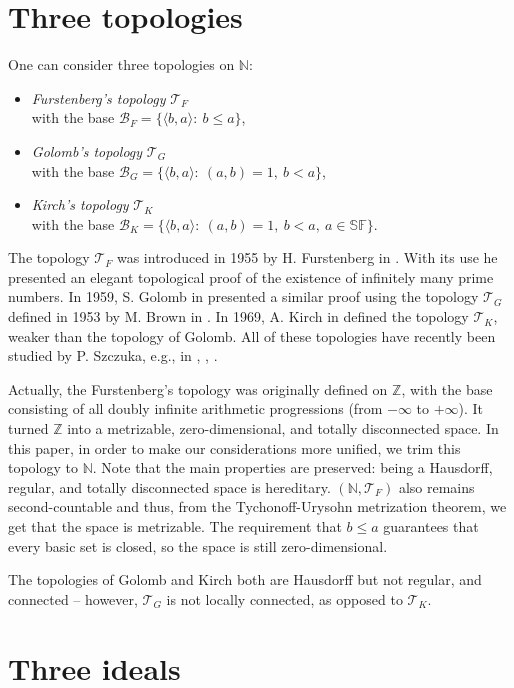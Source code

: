\documentclass{amsart}
\theoremstyle{definition}
\newcommand{\N}{{\mathbb N}}
\newcommand{\Z}{{\mathbb Z}}
\newcommand{\T}{\mathcal{T}}
\newcommand{\B}{\mathcal{B}}
\newcommand{\SqrFr}{\mathbb{SF}}
\newcommand{\arithseq}[2]{\langle#2, #1\rangle}
\begin{document}
\section*{Three topologies}

One can consider three topologies on $\N$:
\begin{itemize}
\item \emph{Furstenberg's topology} $\T_F$ \\
			with the base $\B_F = \{\arithseq{a}{b} :\ b\leq a\}$,
\item \emph{Golomb's topology} $\T_G$ \\
			with the base $\B_G = \{\arithseq{a}{b} :\ (a,b)=1,\ b<a\}$,
\item \emph{Kirch's topology} $\T_K$ \\
			with the base $\B_K = \{\arithseq{a}{b} :\ (a,b)=1,\ b<a,\ a\in\SqrFr\}$.
\end{itemize}

The topology $\T_F$ was introduced in 1955 by H. Furstenberg in \cite{F}. With its use he presented an elegant topological proof of the existence of infinitely many prime numbers. In 1959, S. Golomb in \cite{G} presented a similar proof using the topology $\T_G$ defined in 1953 by M. Brown in \cite{B}. In 1969, A. Kirch in \cite{K} defined the topology $\T_K$, weaker than the topology of Golomb. All of these topologies have recently been studied by P. Szczuka, e.g., in \cite{Szczuka1}, \cite{Szczuka2}, \cite{Szczuka3}.

Actually, the Furstenberg's topology was originally defined on $\Z$, with the base consisting of all doubly infinite arithmetic progressions (from $-\infty$ to $+\infty$). It turned $\Z$ into a metrizable, zero-dimensional, and totally disconnected space. In this paper, in order to make our considerations more unified, we trim this topology to $\N$. Note that the main properties are preserved: being a Hausdorff, regular, and totally disconnected space is hereditary. $(\N,\T_F)$ also remains second-countable and thus, from the Tychonoff-Urysohn metrization theorem, we get that the space is metrizable. The requirement that $b\leq a$ guarantees that every basic set is closed, so the space is still zero-dimensional.

The topologies of Golomb and Kirch both are Hausdorff but not regular, and connected -- however, $\T_G$ is not locally connected, as opposed to $\T_K$.


\section*{Three ideals}
\end{document}
